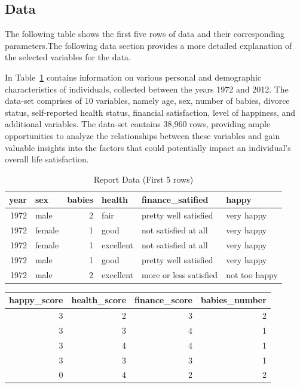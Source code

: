 \documentclass[
  letterpaper,
  DIV=11,
  numbers=noendperiod]{scrartcl}
\begin{document}
\hypertarget{data}{%
\subsection{Data}\label{data}}

The following table shows the first five rows of data and their
corresponding parameters.The following data section provides a more
detailed explanation of the selected variables for the data.

In Table~\ref{tbl-var} contains information on various personal and
demographic characteristics of individuals, collected between the years
1972 and 2012. The data-set comprises of 10 variables, namely age, sex,
number of babies, divorce status, self-reported health status, financial
satisfaction, level of happiness, and additional variables. The data-set
contains 38,960 rows, providing ample opportunities to analyze the
relationships between these variables and gain valuable insights into
the factors that could potentially impact an individual's overall life
satisfaction.

\hypertarget{tbl-var}{}
\begin{table}
\caption{\label{tbl-var}Report Data (First 5 rows) }\tabularnewline

\centering
\begin{tabular}{r|l|r|l|l|l}
\hline
year & sex & babies & health & finance\_satified & happy\\
\hline
1972 & male & 2 & fair & pretty well satisfied & very happy\\
\hline
1972 & female & 1 & good & not satisfied at all & very happy\\
\hline
1972 & female & 1 & excellent & not satisfied at all & very happy\\
\hline
1972 & male & 1 & good & pretty well satisfied & very happy\\
\hline
1972 & male & 2 & excellent & more or less satisfied & not too happy\\
\hline
\end{tabular}
\end{table}

\begin{table}
\centering
\begin{tabular}{r|r|r|r}
\hline
happy\_score & health\_score & finance\_score & babies\_number\\
\hline
3 & 2 & 3 & 2\\
\hline
3 & 3 & 4 & 1\\
\hline
3 & 4 & 4 & 1\\
\hline
3 & 3 & 3 & 1\\
\hline
0 & 4 & 2 & 2\\
\hline
\end{tabular}
\end{table}
\end{document}
